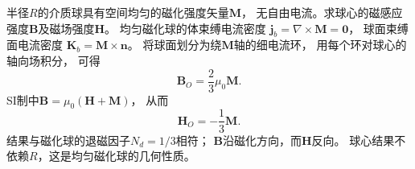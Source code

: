 \problemtext 半径$R$的介质球具有空间均匀的磁化强度矢量$\bm M$，
无自由电流。求球心的磁感应强度$\bm B$及磁场强度$\bm H$。
\workings
均匀磁化球的体束缚电流密度
$\bm j_b=\nabla\times\bm M=\bm0$，
球面束缚面电流密度
$\bm K_b=\bm M\times\bm n$。
将球面划分为绕$\bm M$轴的细电流环，
用每个环对球心的轴向场积分，
可得
\[
\boxed{\bm B_O=\frac23\mu_0\bm M}.
\]
SI制中$\bm B=\mu_0(\bm H+\bm M)$，
从而
\[
\boxed{\bm H_O=-\frac13\bm M}.
\]
\crosscheck 结果与磁化球的退磁因子$N_d=1/3$相符；
$\bm B$沿磁化方向，而$\bm H$反向。
球心结果不依赖$R$，这是均匀磁化球的几何性质。
